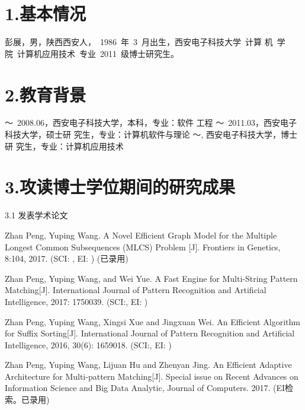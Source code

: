 
\begin{resume}

\section*{1.\hspace{0.75em}基本情况}
彭展，男，陕西西安人，~1986~年~3~月出生，西安电子科技大学~计算
机~学院~计算机应用技术~专业~2011~级博士研究生。
\section*{2.\hspace{0.75em}教育背景}
\begin{resumelist*}
  ～~2008.06，西安电子科技大学，本科，专业：软件
  工程
  ～~2011.03，西安电子科技大学，硕士研
  究生，专业：计算机软件与理论
  ～\hspace{3.5em}, 西安电子科技大学，博士研
  究生，专业：计算机应用技术
\end{resumelist*}

\section*{3.\hspace{0.75em}攻读博士学位期间的研究成果}
\begin{resumelist}{\hspace{-0.25em}3.1\hspace{0.5em} 发表学术论文}

  \resumelistitem Zhan Peng, Yuping Wang. A Novel Efficient Graph
  Model for the Multiple Longest Common Subsequences (MLCS) Problem
  [J]. Frontiers in Genetics, 8:104, 2017. (SCI: , EI: ) (已录用)

  \resumelistitem Zhan Peng, Yuping Wang, and Wei Yue. A Fast Engine
  for Multi-String Pattern Matching[J]. International Journal of Pattern
  Recognition and Artificial Intelligence, 2017: 1750039. (SCI:, EI: )

  \resumelistitem Zhan Peng, Yuping Wang, Xingsi Xue and Jingxuan
  Wei. An Efficient Algorithm for Suffix Sorting[J]. International
  Journal of Pattern Recognition and Artificial Intelligence, 2016,
  30(6): 1659018. (SCI:, EI: )


  \resumelistitem Zhan Peng, Yuping Wang, Lijuan Hu and Zhenyan
  Jing. An Efficient Adaptive Architecture for Multi-pattern
  Matching[J]. Special issue on Recent Advances on Information Science
  and Big Data Analytic, Journal of Computers. 2017. (EI检索。已录用)


\end{resumelist}
\end{resume}
